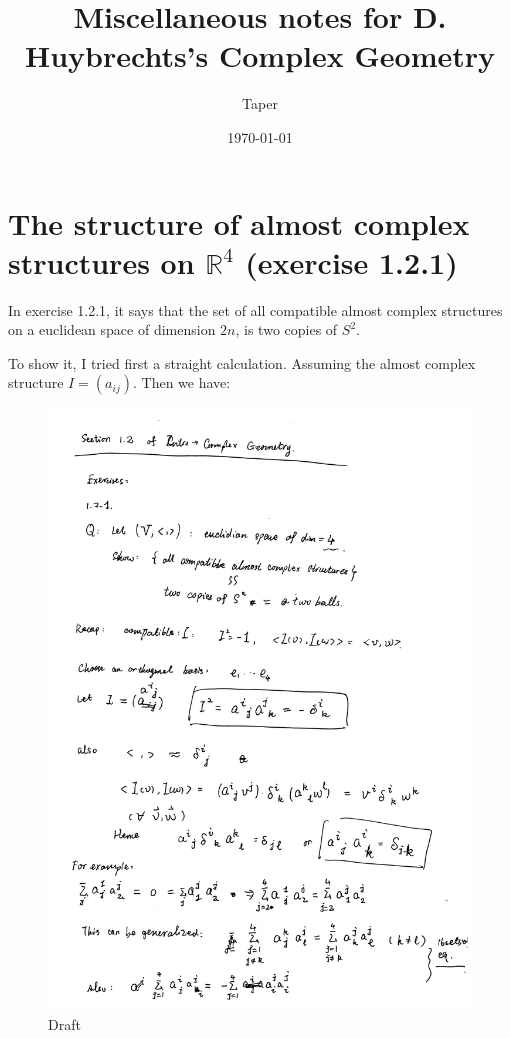 \documentclass{article}
\title{Miscellaneous notes for D. Huybrechts's Complex Geometry}
\date{\today}
\author{Taper}
\numberwithin{equation}{subsection} %
\theoremstyle{definition}
\begin{document}
\maketitle
{}
\tableofcontents
\section{The structure of almost complex structures on \texorpdfstring{$\mathbb{R}^{4}$}{}
  (exercise 1.2.1)}
\label{sec:The_structure_of_almost_complex_structures_on_R2n}
In exercise 1.2.1, it says that the set of all compatible almost complex
structures on a euclidean space of dimension $2n$, is two copies of $S^2$.

To show it, I tried first a straight calculation. Assuming the almost
complex structure $I= (a_{ij})$. Then we have:
\begin{figure}[H]
  \centering
  \includegraphics[scale=0.70]{pdfs/draft_20160908.pdf}
  \caption{Draft}
\end{figure}
\end{document}
